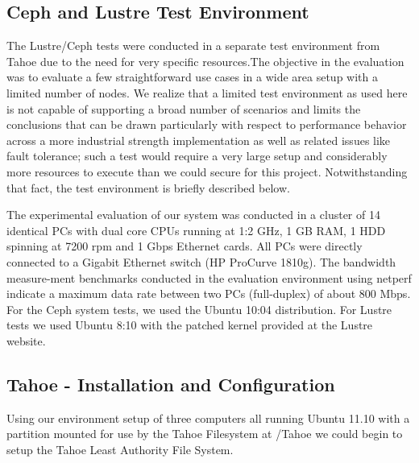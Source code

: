 \documentclass[11pt]{article}
\begin{document}
\subsection{Ceph and Lustre Test Environment}
The Lustre/Ceph tests were conducted in a separate test environment from
Tahoe due to the need for very specific resources.The objective in the 
evaluation was to evaluate a few straightforward use cases in a wide area 
setup with a limited number of nodes. We realize that a limited test 
environment as used here is not capable of supporting a broad number of 
scenarios and limits the conclusions that can be drawn particularly with 
respect to performance behavior across a more industrial strength 
implementation as well as related issues like fault tolerance; such a test 
would require a very large setup and considerably more resources to execute 
than we could secure for this project. Notwithstanding that fact, the test 
environment is briefly described below. 

The experimental evaluation of our system was conducted in a cluster of 14 
identical PCs with dual core CPUs running at 1:2 GHz, 1 GB RAM, 1 HDD 
spinning at 7200 rpm and 1 Gbps Ethernet cards. All PCs were directly 
connected to a Gigabit Ethernet switch (HP ProCurve 1810g). The bandwidth 
measure-ment benchmarks conducted in the evaluation environment using netperf 
indicate a maximum data rate between two PCs (full-duplex) of about 800 Mbps. 
For the Ceph system tests, we used the Ubuntu 10:04 distribution. For Lustre 
tests we used Ubuntu 8:10 with the patched kernel provided at the Lustre 
website.

\subsection{Tahoe - Installation and Configuration}

Using our environment setup of three computers all running Ubuntu
11.10 with a partition mounted for use by the Tahoe Filesystem at
/Tahoe we could begin to setup the Tahoe Least Authority File System.
\end{document}
